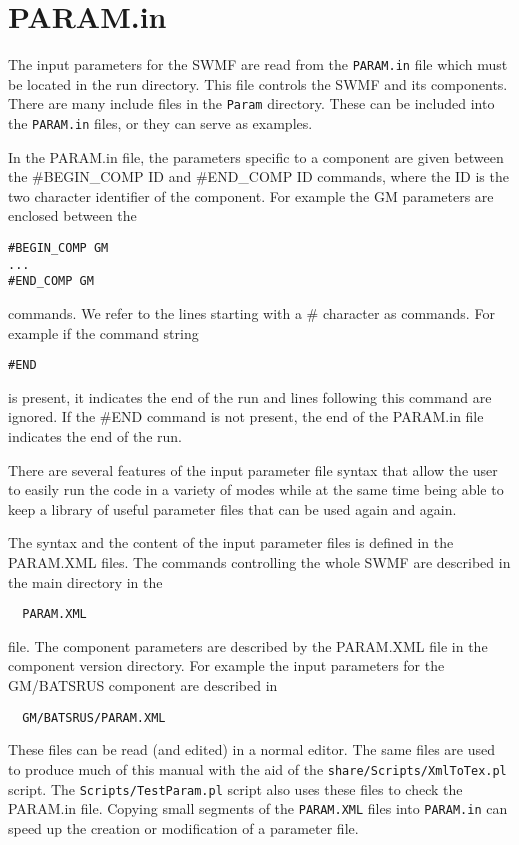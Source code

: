 %

\section{PARAM.in \label{section:param.in}}

The input parameters for the SWMF are read from the 
{\tt PARAM.in} file which must be located in the run directory.
This file controls the SWMF and its components.
There are many include files in the {\tt Param} directory. These
can be included into the {\tt PARAM.in} files, or they can serve as
examples. 

In the PARAM.in file, 
the parameters specific to a component are given between
the \#BEGIN\_COMP ID and \#END\_COMP ID commands,
where the ID is the two character identifier of the component.
For example the GM parameters are enclosed between the 
\begin{verbatim}
#BEGIN_COMP GM
...
#END_COMP GM
\end{verbatim}
commands. We refer to the lines starting with a \# character as commands.
For example if the command string 
\begin{verbatim}
#END
\end{verbatim}
is present, it indicates the end of the run and lines following
this command are ignored. If the \#END command is not
present, the end of the PARAM.in file indicates the end of the run.

There are several features of the input parameter file syntax
that allow the user to easily run the code
in a variety of modes while at the same time being able to 
keep a library of useful parameter files that can be used
again and again.

The syntax and the content of the input parameter files
is defined in the PARAM.XML files. The commands controlling
the whole SWMF are described in the main directory in the
\begin{verbatim}
  PARAM.XML
\end{verbatim}
file. The component parameters are described by the PARAM.XML
file in the component version directory. For example the
input parameters for the GM/BATSRUS component are described in
\begin{verbatim}
  GM/BATSRUS/PARAM.XML
\end{verbatim}
These files can be read (and edited) in a normal editor.
The same files are used to produce much of this
manual with the aid of the {\tt share/Scripts/XmlToTex.pl} script. 
The {\tt Scripts/TestParam.pl} script also uses these files
to check the PARAM.in file.
Copying small segments of the {\tt PARAM.XML} files
into {\tt PARAM.in} can speed up the creation or modification of a 
parameter file. 

